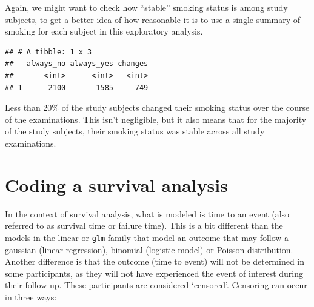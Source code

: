 \documentclass[
]{book}
\newenvironment{Shaded}{\begin{snugshade}}{\end{snugshade}}
\newcommand{\DataTypeTok}[1]{\textcolor[rgb]{0.13,0.29,0.53}{#1}}
\newcommand{\DecValTok}[1]{\textcolor[rgb]{0.00,0.00,0.81}{#1}}
\newcommand{\KeywordTok}[1]{\textcolor[rgb]{0.13,0.29,0.53}{\textbf{#1}}}
\newcommand{\NormalTok}[1]{#1}
\newcommand{\OperatorTok}[1]{\textcolor[rgb]{0.81,0.36,0.00}{\textbf{#1}}}
\newcommand{\StringTok}[1]{\textcolor[rgb]{0.31,0.60,0.02}{#1}}
\begin{document}
Again, we might want to check how ``stable'' smoking status is among study subjects, to get a better idea of how reasonable it is to use a single summary of smoking for each subject in this exploratory analysis.

\begin{Shaded}
\end{Shaded}

\begin{verbatim}
## # A tibble: 1 x 3
##   always_no always_yes changes
##       <int>      <int>   <int>
## 1      2100       1585     749
\end{verbatim}

Less than 20\% of the study subjects changed their smoking status over the course of the examinations. This isn't negligible, but it also means that for the majority of the study subjects, their smoking status was stable across all study examinations.

\hypertarget{coding-a-survival-analysis}{%
\section{Coding a survival analysis}\label{coding-a-survival-analysis}}

In the context of survival analysis, what is modeled is time to an event (also referred to as survival time or failure time). This is a bit different than the models in the linear or \texttt{glm} family that model an outcome that may follow a gaussian (linear regression), binomial (logistic model) or Poisson distribution. Another difference is that the outcome (time to event) will not be determined in some participants, as they will not have experienced the event of interest during their follow-up. These participants are considered `censored'. Censoring can occur in three ways:
\end{document}
